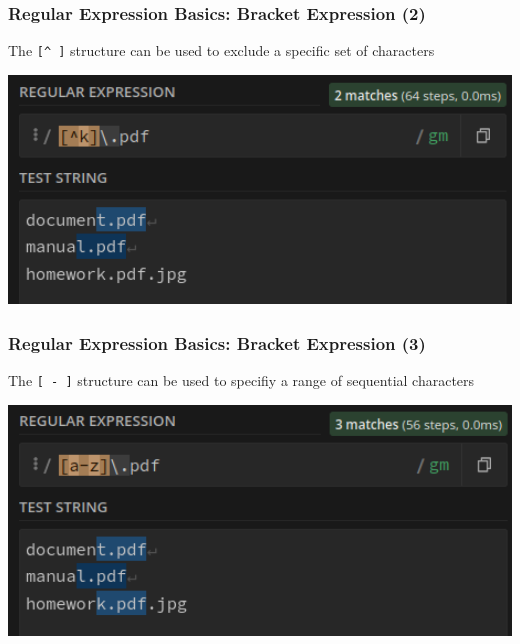 \documentclass{beamer}
\begin{document}
\begin{frame}[fragile]
    \frametitle{Regular Expression Basics: Bracket Expression (2)}
    \begin{center}
        The \texttt{\Large [\textasciicircum \; ]} structure can be used to exclude a specific set of characters
    \end{center}
    \begin{center}
    \includegraphics[width=1.0\textwidth]{pics/regex/regex5.png}
    \end{center}
\end{frame}

\begin{frame}[fragile]
    \frametitle{Regular Expression Basics: Bracket Expression (3)}
    \begin{center}
        The \texttt{\Large [ \thinspace - \thinspace ]} structure can be used to specifiy a range of sequential characters
    \end{center}
    \begin{center}
    \includegraphics[width=1.0\textwidth]{pics/regex/regex6.png}
    \end{center}
\end{frame}
\end{document}
